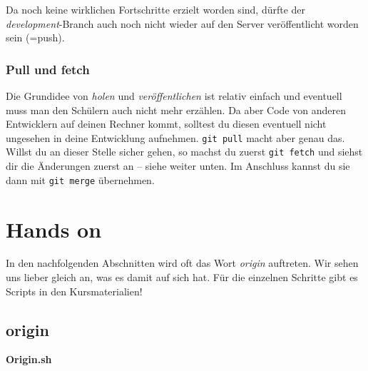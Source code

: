 \documentclass[
  letterpaper,
  DIV=11]{scrreprt}
\newenvironment{Shaded}{\begin{snugshade}}{\end{snugshade}}
\newcommand{\AttributeTok}[1]{\textcolor[rgb]{0.40,0.45,0.13}{#1}}
\newcommand{\BuiltInTok}[1]{\textcolor[rgb]{0.00,0.23,0.31}{#1}}
\newcommand{\CommentTok}[1]{\textcolor[rgb]{0.37,0.37,0.37}{#1}}
\newcommand{\ControlFlowTok}[1]{\textcolor[rgb]{0.00,0.23,0.31}{\textbf{#1}}}
\newcommand{\FunctionTok}[1]{\textcolor[rgb]{0.28,0.35,0.67}{#1}}
\newcommand{\NormalTok}[1]{\textcolor[rgb]{0.00,0.23,0.31}{#1}}
\newcommand{\OperatorTok}[1]{\textcolor[rgb]{0.37,0.37,0.37}{#1}}
\newcommand{\OtherTok}[1]{\textcolor[rgb]{0.00,0.23,0.31}{#1}}
\newcommand{\VariableTok}[1]{\textcolor[rgb]{0.07,0.07,0.07}{#1}}
\newcommand{\cmd}[1]{\texttt{#1}\xspace}
\newcommand{\branch}[1]{\textit{#1}\xspace}
\begin{document}
Da noch keine wirklichen Fortschritte erzielt worden sind, dürfte der
\branch{development}-Branch auch noch nicht wieder auf den Server
veröffentlicht worden sein (=push).

\subsubsection{Pull und fetch}\label{pull-und-fetch}

Die Grundidee von \emph{holen} und \emph{veröffentlichen} ist relativ
einfach und eventuell muss man den Schülern auch nicht mehr erzählen. Da
aber Code von anderen Entwicklern auf deinen Rechner kommt, solltest du
diesen eventuell nicht ungesehen in deine Entwicklung aufnehmen.
\cmd{git pull} macht aber genau das.\\
Willst du an dieser Stelle sicher gehen, so machst du zuerst
\cmd{git fetch} und siehst dir die Änderungen zuerst an -- siehe weiter
unten. Im Anschluss kannst du sie dann mit \cmd{git merge} übernehmen.

\section{Hands on}\label{hands-on-1}

In den nachfolgenden Abschnitten wird oft das Wort \emph{origin}
auftreten. Wir sehen uns lieber gleich an, was es damit auf sich hat.
Für die einzelnen Schritte gibt es Scripts in den Kursmaterialien!

\subsection{origin}\label{origin}

\textbf{Origin.sh}

\begin{Shaded}
\end{Shaded}
\end{document}

